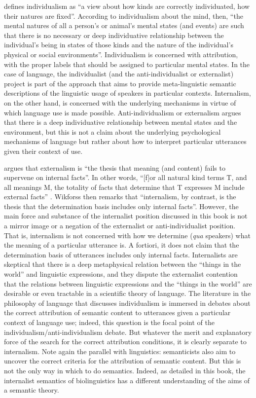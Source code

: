 \citet[3-4]{Burge1986} defines individualism as “a view about how kinds are correctly individuated, how their natures are fixed”. According to individualism about the mind, then, “the mental natures of all a person’s or animal’s mental states (and events) are such that there is no necessary or deep individuative relationship between the individual’s being in states of those kinds and the nature of the individual’s physical or social environments”. Individualism is concerned with attribution, with the proper labels that should be assigned to particular mental states. In the case of language, the individualist (and the anti-individualist or externalist) project is part of the approach that aims to provide meta-linguistic semantic descriptions of the linguistic usage of speakers in particular contexts. Internalism, on the other hand, is concerned with the underlying mechanisms in virtue of which language use is made possible. Anti-individualism or externalism argues that there is a deep individuative relationship between mental states and the environment, but this is not a claim about the underlying psychological mechanisms of language but rather about how to interpret particular utterances given their context of use.

\citet{Wikforss2008} argues that externalism is “the thesis that meaning (and content) fails to supervene on internal facts”. In other words, “[f]or all natural kind terms T, and all meanings M, the totality of facts that determine that T expresses M include external facts” \citep[161]{Wikforss2008}. Wikforss then remarks that “internalism, by contrast, is the thesis that the determination basis includes only internal facts”. However, the main force and substance of the internalist position discussed in this book is not a mirror image or a negation of the externalist or anti-individualist position. That is, internalism is not concerned with how we determine (\textit{qua} speakers) what the meaning of a particular utterance is. A fortiori, it does not claim that the determination basis of utterances includes only internal facts. Internalists are skeptical that there is a deep metaphysical relation between the “things in the world” and linguistic expressions, and they dispute the externalist contention that the relations between linguistic expressions and the “things in the world” are desirable or even tractable in a scientific theory of language. The literature in the philosophy of language that discusses individualism is immersed in debates about the correct attribution of semantic content to utterances given a particular context of language use; indeed, this question is the focal point of the individualism/anti-individualism debate. But whatever the merit and explanatory force of the search for the correct attribution conditions, it is clearly separate to internalism. Note again the parallel with linguistics: semanticists also aim to uncover the correct criteria for the attribution of semantic content. But this is not the only way in which to do semantics. Indeed, as detailed in this book, the internalist semantics of biolinguistics has a different understanding of the aims of a semantic theory.

